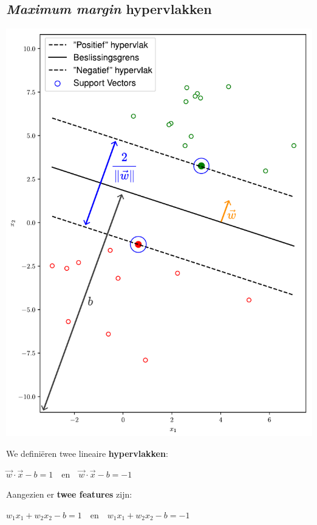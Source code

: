 \documentclass[kulak]{kulakposter}
\begin{document}
\begin{multicols}{2}
	\section{\textit{Maximum margin} hypervlakken}
	\vfill \null
		\begin{multicols}{2}
			\setlength\columnsep{0cm}
			\photohere
			\includegraphics[width=.90\columnwidth]{svm}
			
			\columnbreak
			
			\vspace{1cm} \null
			
			We definiëren twee lineaire \textbf{hypervlakken}:
			\begin{center}
				\(\vec{w} \cdot \vec{x} - b = 1 \quad \text{en} \quad \vec{w} \cdot \vec{x} - b = -1\)
			\end{center}
			
			\vspace{0.3cm}

			Aangezien er \textbf{twee features} zijn:
			\begin{center}
				\(w_1x_1 + w_2x_2 - b = 1 \quad \text{en} \quad w_1x_1 + w_2x_2 - b = -1\)
			\end{center}
			

\end{multicols}
\end{multicols}
\end{document}
